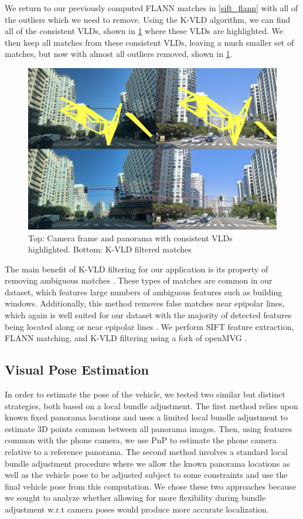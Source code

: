 \documentclass[conference]{IEEEtran}
\begin{document}
We return to our previously computed FLANN matches in \ref{sift_flann} with all of the outliers which we need to remove. Using the K-VLD algorithm, we can find all of the consistent VLDs, shown in \ref{kvld_filtered} where these VLDs are highlighted. We then keep all matches from these consistent VLDs, leaving a much smaller set of matches, but now with almost all outliers removed, shown in \ref{kvld_filtered}.

\begin{figure}[htb]
\centerline{\includegraphics[scale=0.2]{Images/kvld_filtered.jpg}}
\caption{Top: Camera frame and panorama with consistent VLDs highlighted. Bottom: K-VLD filtered matches }
\label{kvld_filtered}
\end{figure}

The main benefit of K-VLD filtering for our application is its property of removing ambiguous matches \cite{kvld}. These types of matches are common in our dataset, which features large numbers of ambiguous features such as building windows. Additionally, this method removes false matches near epipolar lines, which again is well suited for our dataset with the majority of detected features being located along or near epipolar lines \cite{kvld}. We perform SIFT feature extraction, FLANN matching, and K-VLD filtering using a fork of openMVG \cite{mvg}.



\subsection{Visual Pose Estimation}
In order to estimate the pose of the vehicle, we tested two similar but distinct strategies, both based on a local bundle adjustment. The first method relies upon known fixed panorama locations and uses a limited local bundle adjustment to estimate 3D points common between all panorama images. Then, using features common with the phone camera, we use PnP to estimate the phone camera relative to a reference panorama. The second method involves a standard local bundle adjustment procedure where we allow the known panorama locations as well as the vehicle pose to be adjusted subject to some constraints and use the final vehicle pose from this computation. We chose these two approaches because we sought to analyze whether allowing for more flexibility during bundle adjustment w.r.t camera poses would produce more accurate localization. 
\end{document}
